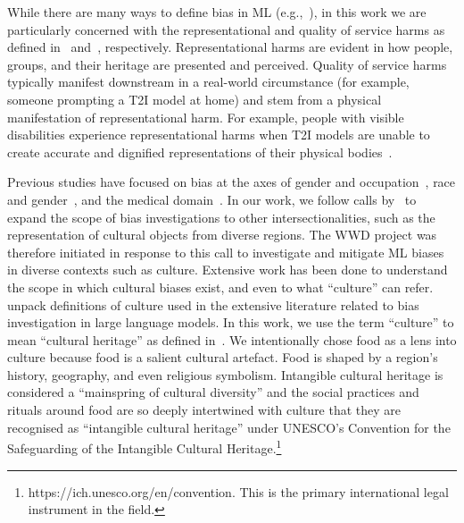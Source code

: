 While there are many ways to define bias in ML (e.g.,~\cite{weidinger2021ethical, weidinger2023sociotechnical, mehrabi2021survey, katzman2023taxonomising, shelby2023sociotechnical}), in this work we are particularly concerned with the representational and quality of service harms as defined in~\cite{weidinger2021ethical, weidinger2023sociotechnical} and~\cite{shankar2017allocational, de2019doescvworkallocational}, respectively. Representational harms are evident in how people, groups, and their heritage are presented and perceived. Quality of service harms typically manifest downstream in a real-world circumstance (for example, someone prompting a T2I model at home) and stem from a physical manifestation of representational harm. For example, people with visible disabilities experience representational harms when T2I models are unable to create accurate and dignified representations of their physical bodies~\cite{mack2024they}. 

Previous studies have focused on bias at the axes of gender and occupation~\cite{berg2022prompt_bias, hall2024visogender_bias,WinogenderRudinger2018_bias}, race and gender~\cite{currie2024genderethnicity, west2024fieldgenderethnicity}, and the medical domain~\cite{gisselbaek2024beyondmedical, wiegand2024demographicmedical}. In our work, we follow calls by~\citet{weidinger2023sociotechnical} to expand the scope of bias investigations to other intersectionalities, such as the representation of cultural objects from diverse regions. The \textsc{WWD} project was therefore initiated in response to this call to investigate and mitigate ML biases in diverse contexts such as culture. Extensive work has been done to understand the scope in which cultural biases exist, and even to what ``culture'' can refer.~\citet{adilazuarda2024culturesurvey} unpack definitions of culture used in the extensive literature related to bias investigation in large language models. In this work, we use the term ``culture'' to mean ``cultural heritage'' as defined in~\cite{adilazuarda2024culturesurvey, blake2000defining}. We intentionally chose food as a lens into culture because food is a salient cultural artefact. Food is shaped by a region's history, geography, and even religious symbolism. Intangible cultural heritage is considered a ``mainspring of cultural diversity'' and the social practices and rituals around food are so deeply intertwined with culture that they are recognised as ``intangible cultural heritage'' under UNESCO's Convention for the Safeguarding of the Intangible Cultural Heritage.\footnote{https://ich.unesco.org/en/convention. This is the primary international legal instrument in the field.} 

